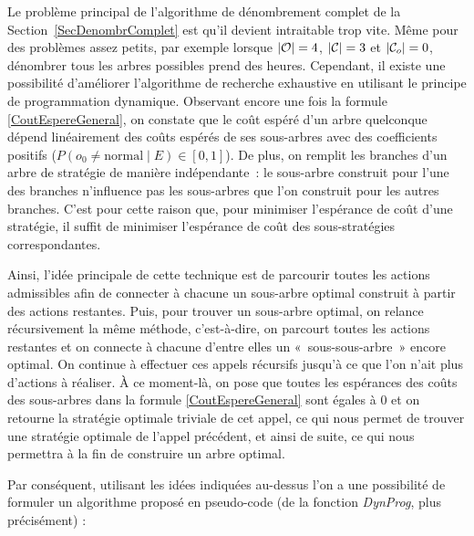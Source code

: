 \documentclass[a4paper,11pt]{article}
\theoremstyle{plain}
\theoremstyle{definition}
\DeclarePairedDelimiter{\abs}{\lvert}{\rvert}
\begin{document}
Le problème principal de l'algorithme de dénombrement complet de la Section~\ref{SecDenombrComplet} est qu'il devient intraitable trop vite. Même pour des problèmes assez petits, par exemple lorsque $\abs{\mathcal O} = 4$, $\abs{\mathcal C} = 3$ et $\abs{\mathcal C_o} = 0$, dénombrer tous les arbres possibles prend des heures. Cependant, il existe une possibilité d'améliorer l'algorithme de recherche exhaustive en utilisant le principe de programmation dynamique. Observant encore une fois la formule \eqref{CoutEspereGeneral}, on constate que le coût espéré d'un arbre quelconque dépend linéairement des coûts espérés de ses sous-arbres avec des coefficients positifs ($P(o_0 \neq \text{normal} \mid E) \in \left[0, 1\right]$). De plus, on remplit les branches d'un arbre de stratégie de manière indépendante~: le sous-arbre construit pour l'une des branches n'influence pas les sous-arbres que l'on construit pour les autres branches. C'est pour cette raison que, pour minimiser l'espérance de coût d'une stratégie, il suffit de minimiser l'espérance de coût des sous-stratégies correspondantes.

Ainsi, l'idée principale de cette technique est de parcourir toutes les actions admissibles afin de connecter à chacune un sous-arbre optimal construit à partir des actions restantes. Puis, pour trouver un sous-arbre optimal, on relance récursivement la même méthode, c'est-à-dire, on parcourt toutes les actions restantes et on connecte à chacune d'entre elles un «~sous-sous-arbre~» encore optimal. On continue à effectuer ces appels récursifs jusqu'à ce que l'on n'ait plus d'actions à réaliser. À ce moment-là, on pose que toutes les espérances des coûts des sous-arbres dans la formule \eqref{CoutEspereGeneral} sont égales à $0$ et on retourne la stratégie optimale triviale de cet appel, ce qui nous permet de trouver une stratégie optimale de l'appel précédent, et ainsi de suite, ce qui nous permettra à la fin de construire un arbre optimal.

Par conséquent, utilisant les idées indiquées au-dessus l'on a une possibilité de formuler un algorithme proposé en pseudo-code (de la fonction \emph{DynProg}, plus précisément) :
\end{document}
